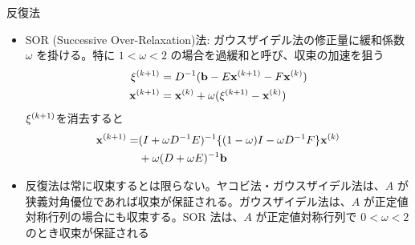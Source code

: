 \begin{frame}[t,fragile]{反復法}
  \begin{itemize}
  \item SOR (Successive Over-Relaxation)法: ガウスザイデル法の修正量に緩和係数 $\omega$ を掛ける。特に $1<\omega<2$ の場合を過緩和と呼び、収束の加速を狙う
    \begin{align*}
      {\bf \xi}^{(k+1)} &= D^{-1} ({\bf b} - E{\bf x}^{(k+1)} - F{\bf x}^{(k)}) \\
      {\bf x}^{(k+1)} &= {\bf x}^{(k)} + \omega({\bf \xi}^{(k+1)} - {\bf x}^{(k)})
    \end{align*}
    ${\bf \xi}^{(k+1)}$を消去すると
    \begin{align*}
      {\bf x}^{(k+1)} = &(I+\omega D^{-1}E)^{-1} \{(1-\omega)I - \omega D^{-1} F\}{\bf x}^{(k)} \\ &+ \omega(D+\omega E)^{-1}{\bf b}
    \end{align*}
    \item 反復法は常に収束するとは限らない。ヤコビ法・ガウスザイデル法は、$A$ が狭義対角優位であれば収束が保証される。ガウスザイデル法は、$A$ が正定値対称行列の場合にも収束する。SOR 法は、$A$ が正定値対称行列で $0<\omega<2$ のとき収束が保証される
  \end{itemize}
\end{frame}
